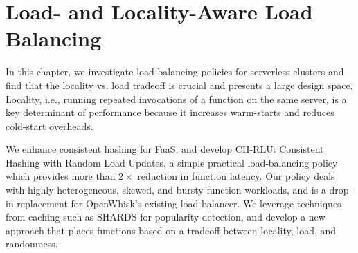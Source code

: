 \chapter{Load- and Locality-Aware Load Balancing}
\label{chap:chrlu}

In this chapter, we investigate load-balancing policies for serverless clusters and find that the locality vs. load tradeoff is crucial and presents a large design space.
Locality, i.e., running repeated invocations of a function on the same server, is a key determinant of performance because it increases warm-starts and reduces cold-start overheads. 

We enhance consistent hashing for FaaS, and develop CH-RLU: Consistent Hashing with Random Load Updates, a simple practical load-balancing policy which provides more than $2\times$ reduction in function latency. 
Our policy deals with highly heterogeneous, skewed, and bursty function workloads, and is a drop-in replacement for OpenWhisk's existing load-balancer.
We leverage techniques from caching such as SHARDS for popularity detection, and develop a new approach that places functions based on a tradeoff between locality, load, and randomness. 














